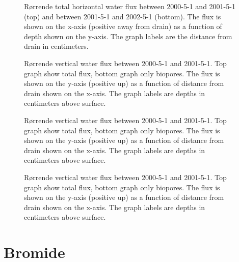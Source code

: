 \begin{figure}[htbp]
  \centering
  
  \caption{R{\o}rrende total horizontal water flux between 2000-5-1 and
    2001-5-1 (top) and between 2001-5-1 and 2002-5-1 (bottom).  The
    flux is shown on the x-axis (positive away from drain) as a
    function of depth shown on the y-axis.  The graph labels are the
    distance from drain in centimeters.}
  \label{fig:Rorrende-water-horizontal}
\end{figure}

\begin{figure}[htbp]
  \centering
  
  \caption{R{\o}rrende vertical water flux between 2000-5-1 and 2001-5-1.
    Top graph show total flux, bottom graph only biopores. The flux is
    shown on the y-axis (positive up) as a function of distance from
    drain shown on the x-axis.  The graph labels are depths in
    centimeters above surface.}
  \label{fig:Rorrende-water-2000}
\end{figure}
\begin{figure}[htbp]
  \centering
  
  \caption{R{\o}rrende vertical water flux between 2000-5-1 and 2001-5-1.
    Top graph show total flux, bottom graph only biopores. The flux is
    shown on the y-axis (positive up) as a function of distance from
    drain shown on the x-axis.  The graph labels are depths in
    centimeters above surface.}
  \label{fig:Rorrende-water-2000}
\end{figure}
\begin{figure}[htbp]
  \centering
  
  \caption{R{\o}rrende vertical water flux between 2000-5-1 and 2001-5-1.
    Top graph show total flux, bottom graph only biopores. The flux is
    shown on the y-axis (positive up) as a function of distance from
    drain shown on the x-axis.  The graph labels are depths in
    centimeters above surface.}
  \label{fig:Rorrende-water-2000}
\end{figure}

\FloatBarrier
\section{Bromide}

